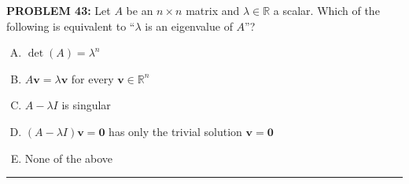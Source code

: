 \documentclass[12pt]{amsart}
\newcommand{\divider}{
  \vspace{-1em} %
  \noindent
  \raisebox{-0.15ex}{\textbullet}%
  \hspace{0.5em}%
  \rule[0.5ex]{0.95\textwidth}{1.0pt}%
  \hspace{0.5em}%
  \raisebox{-0.15ex}{\textbullet}%
  \vspace{0em} %
}
\begin{document}
{\bf PROBLEM 43:}
%
Let $A$ be an $n \times n$ matrix and $\lambda \in \mathbb{R}$ a scalar. Which of the following is equivalent to ``$\lambda$ is an eigenvalue of $A$''?

\begin{enumerate}[(A)]
\item $\det(A) = \lambda^n$
\item $A\mathbf{v} = \lambda \mathbf{v}$ for every $\mathbf{v} \in \mathbb{R}^n$
\item $A - \lambda I$ is singular
\item $(A - \lambda I)\mathbf{v} = \mathbf{0}$ has only the trivial solution $\mathbf{v} = \mathbf{0}$
\item None of the above
\end{enumerate}

%
%
%
\divider
\end{document}
